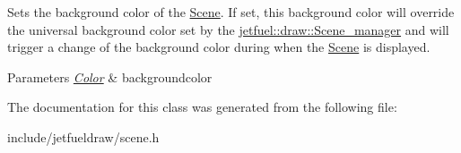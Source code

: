 Sets the background color of the \hyperlink{classjetfuel_1_1draw_1_1Scene}{Scene}. If set, this background color will override the universal background color set by the \hyperlink{classjetfuel_1_1draw_1_1Scene__manager}{jetfuel\+::draw\+::\+Scene\+\_\+manager} and will trigger a change of the background color during when the \hyperlink{classjetfuel_1_1draw_1_1Scene}{Scene} is displayed.


\begin{DoxyParams}{Parameters}
{\em \hyperlink{classjetfuel_1_1draw_1_1Color}{Color}} & backgroundcolor \\
\hline
\end{DoxyParams}


The documentation for this class was generated from the following file\+:\begin{DoxyCompactItemize}
\item 
include/jetfueldraw/scene.\+h\end{DoxyCompactItemize}
